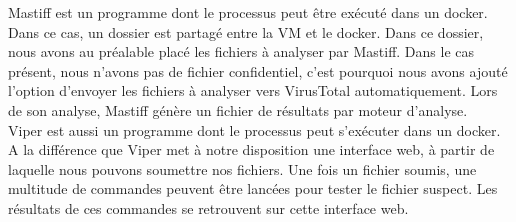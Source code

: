 \documentclass[smallextended]{svjour3}       %
\begin{document}
Mastiff est un programme dont le processus peut être exécuté dans un docker. Dans ce cas, un dossier est partagé entre la VM et le docker. Dans ce dossier, nous avons au préalable placé les fichiers à analyser par Mastiff. Dans le cas présent, nous n'avons pas de fichier confidentiel, c'est pourquoi nous avons ajouté l'option d'envoyer les fichiers à analyser vers VirusTotal automatiquement. Lors de son analyse, Mastiff génère un fichier de résultats par moteur d'analyse.\\
$ $\\
Viper est aussi un programme dont le processus peut s’exécuter dans un docker. A la différence que Viper met à notre disposition une interface web, à partir de laquelle nous pouvons soumettre nos fichiers. Une fois un fichier soumis, une multitude de commandes peuvent être lancées pour tester le fichier suspect. Les résultats de ces commandes se retrouvent sur cette interface web.\\
\end{document}
